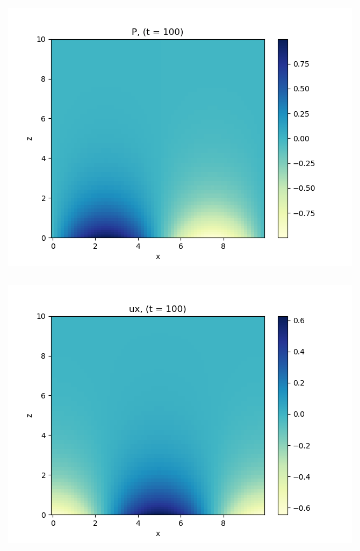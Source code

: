 \documentclass[11pt,
        usenames, %
        dvipsnames %
    ]{report}
\begin{document}
\begin{figure}[!h]
    \begin{subfigure}{0.3\textwidth}
        \centering
        \includegraphics[width=\textwidth]{../sims_old/2d_0_no_g/no_g_P_t100.png}
    \end{subfigure}
    \begin{subfigure}{0.3\textwidth}
        \centering
        \includegraphics[width=\textwidth]{../sims_old/2d_0_no_g/no_g_ux_t100.png}
    \end{subfigure}
    \begin{subfigure}{0.3\textwidth}
        \centering

\end{subfigure}
\end{figure}
\end{document}
